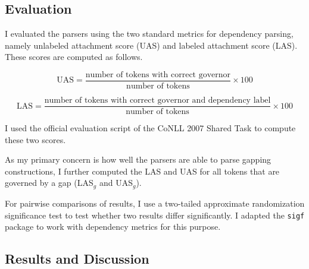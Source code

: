 \documentclass[lucida,biblatex]{sp} %
\begin{document}
\subsection{Evaluation}

I evaluated the parsers using the two standard metrics for dependency parsing, namely unlabeled attachment score (UAS) and labeled attachment score (LAS). These scores are computed as follows.

\[
\mbox{UAS} = \frac{\mbox{number of tokens with correct governor}}{\mbox{number of tokens}} \times 100 
\]

\[
\mbox{LAS} = \frac{\mbox{number of tokens with correct governor and dependency label}}{\mbox{number of tokens}} \times 100
\]

\noindent I used the official evaluation script of the CoNLL 2007 Shared Task \citep{Nivre2007} to compute these two scores.

As my primary concern is how well the parsers are able to parse gapping constructions, I further computed the LAS and UAS for all tokens that are governed by a gap (LAS$_{g}$ and UAS$_{g}$).

For pairwise comparisons of results, I use a two-tailed approximate randomization significance test \citep{Yeh2000,Noreen1989} to test whether two results differ significantly. I adapted
the {\tt sigf} package \citep{Pado2006} to work with dependency metrics for this purpose.


\subsection{Results and Discussion}
\end{document}
